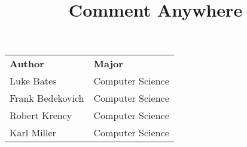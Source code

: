 \documentclass[14pt]{article}
\title{\vspace{2cm} \Huge Comment Anywhere}
\author{}
\date{}
\begin{document}
    
\maketitle
\thispagestyle{fancy}

\vspace{12cm}

\begin{center}
    \begin{tabular}{l l}
        \textbf{Author} & \textbf{Major} \\
        Luke Bates & Computer Science \\
        Frank Bedekovich \hspace{1cm} & Computer Science \\
        Robert Krency & Computer Science \\
        Karl Miller & Computer Science
    \end{tabular}    
\end{center}


\pagebreak






\end{document}
